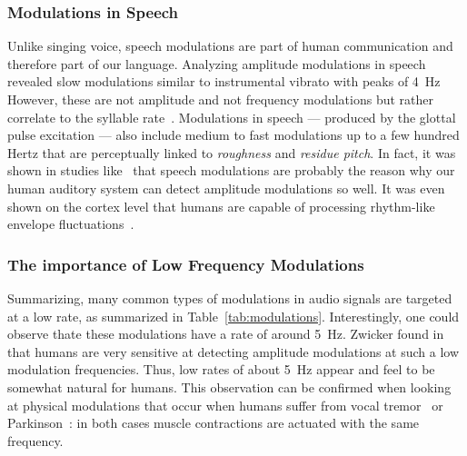 \subsubsection*{Modulations in Speech}

Unlike singing voice, speech modulations are part of human communication and therefore part of our language.
Analyzing amplitude modulations in speech revealed slow modulations similar to instrumental vibrato with peaks of 4~\si{\hertz}~\cite{greenberg97, fuellgrabe09}
However, these are not amplitude and not frequency modulations but rather correlate to the syllable rate~\cite{plomp83, houtgast85}.
Modulations in speech --- produced by the glottal pulse excitation ---  also include medium to fast modulations up to a few hundred Hertz that are perceptually linked to \emph{roughness} and \emph{residue pitch}.
In fact, it was shown in studies like~\cite{joris04} that speech modulations are probably the reason why our human auditory system can detect amplitude modulations so well.
It was even shown on the cortex level that humans are capable of processing rhythm-like envelope fluctuations~\cite{schreiner88, plomp83}.

\subsubsection*{The importance of Low Frequency Modulations}

Summarizing, many common types of modulations in audio signals are targeted at a low rate, as summarized in Table~\ref{tab:modulations}.
Interestingly, one could observe thate these modulations have a rate of around 5~\si{\hertz}. 
Zwicker found in~\cite{zwicker52} that humans are very sensitive at detecting amplitude modulations at such a low modulation frequencies.
Thus, low rates of about 5~\si{\hertz} appear and feel to be somewhat natural for humans.
This observation can be confirmed when looking at physical modulations that occur when humans suffer from vocal tremor~\cite{ramig87} or Parkinson~\cite{botzel14}: in both cases muscle contractions are actuated with the same frequency.

